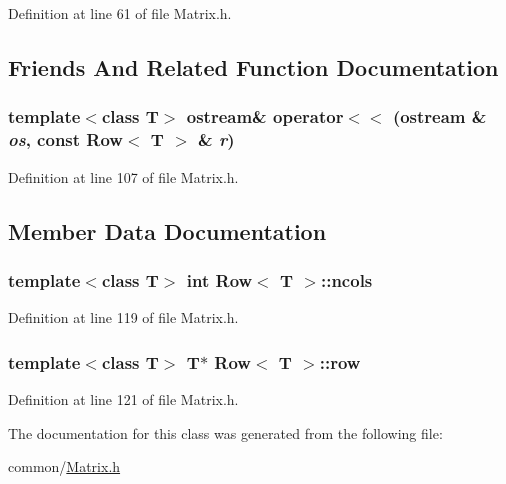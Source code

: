 Definition at line 61 of file Matrix.h.



\subsection{Friends And Related Function Documentation}
\hypertarget{classRow_a8aaaee73ace04bfd4dda937bc311a16e}{
\subsubsection[{operator$<$$<$}]{\setlength{\rightskip}{0pt plus 5cm}template$<$class T$>$ ostream\& operator$<$$<$ (ostream \& {\em os}, \/  const {\bf Row}$<$ T $>$ \& {\em r})}}
\label{classRow_a8aaaee73ace04bfd4dda937bc311a16e}


Definition at line 107 of file Matrix.h.



\subsection{Member Data Documentation}
\hypertarget{classRow_add6775001d80906bbc22d3d7a5a42fa1}{
\subsubsection[{ncols}]{\setlength{\rightskip}{0pt plus 5cm}template$<$class T$>$ int {\bf Row}$<$ T $>$::{\bf ncols}}}
\label{classRow_add6775001d80906bbc22d3d7a5a42fa1}


Definition at line 119 of file Matrix.h.

\hypertarget{classRow_a76906ed1430eeaa38f694dbb3a841442}{
\subsubsection[{row}]{\setlength{\rightskip}{0pt plus 5cm}template$<$class T$>$ T$\ast$ {\bf Row}$<$ T $>$::{\bf row}}}
\label{classRow_a76906ed1430eeaa38f694dbb3a841442}


Definition at line 121 of file Matrix.h.



The documentation for this class was generated from the following file:\begin{DoxyCompactItemize}
\item 
common/\hyperlink{Matrix_8h}{Matrix.h}\end{DoxyCompactItemize}

